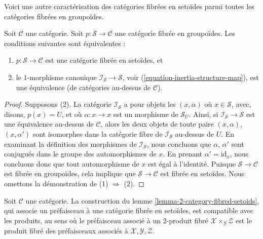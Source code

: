\noindent
Voici une autre caractérisation des catégories fibrées en setoïdes parmi
toutes les catégories fibrées en groupoïdes.

\begin{lemma}
\label{lemma-characterize-fibred-setoids-inertia}
Soit $\mathcal{C}$ une catégorie.
Soit $p : \mathcal{S} \to \mathcal{C}$ une catégorie fibrée en groupoïdes.
Les conditions suivantes sont équivalentes :
\begin{enumerate}
\item $p : \mathcal{S} \to \mathcal{C}$ est une catégorie fibrée en setoïdes,
et
\item le $1$-morphisme canonique $\mathcal{I}_\mathcal{S} \to \mathcal{S}$,
voir (\ref{equation-inertia-structure-map}), est une équivalence (de catégories
au-dessus de $\mathcal{C}$).
\end{enumerate}
\end{lemma}

\begin{proof}
Supposons (2). La catégorie $\mathcal{I}_\mathcal{S}$ a pour objets
les $(x, \alpha)$ où $x \in \mathcal{S}$, avec, disons, $p(x) = U$, et où
$\alpha : x \to x$ est un morphisme de $\mathcal{S}_U$. Ainsi, si
$\mathcal{I}_\mathcal{S} \to \mathcal{S}$ est une équivalence au-dessus de
$\mathcal{C}$, alors les deux objets de toute paire
$(x, \alpha)$, $(x, \alpha')$ sont isomorphes dans la catégorie fibre de
$\mathcal{I}_\mathcal{S}$ au-dessus de $U$.
En examinant la définition des morphismes de $\mathcal{I}_\mathcal{S}$,
nous concluons que $\alpha$, $\alpha'$ sont conjugués dans le groupe
des automorphismes de $x$. En prenant $\alpha' = \text{id}_x$, nous concluons
donc que tout automorphisme de $x$ est égal à l'identité.
Puisque $\mathcal{S} \to \mathcal{C}$ est fibrée en groupoïdes, cela implique
que $\mathcal{S} \to \mathcal{C}$ est fibrée en setoïdes.
Nous omettons la démonstration de (1) $\Rightarrow$ (2).
\end{proof}

\begin{lemma}
\label{lemma-category-fibred-setoids-presheaves-products}
Soit $\mathcal{C}$ une catégorie.
La construction du
lemme \ref{lemma-2-category-fibred-setoids},
qui associe un préfaisceau à une catégorie fibrée en setoïdes,
est compatible avec les produits, au sens où le préfaisceau associé à un
$2$-produit fibré $\mathcal{X} \times_\mathcal{Y} \mathcal{Z}$
est le produit fibré des préfaisceaux associés à
$\mathcal{X}, \mathcal{Y}, \mathcal{Z}$.
\end{lemma}


